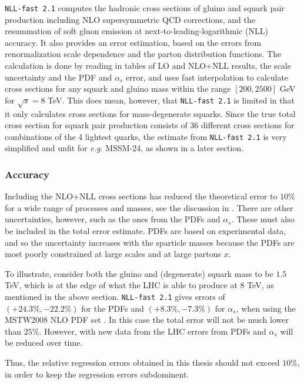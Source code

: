 \documentclass[twoside,english]{uiofysmaster}
\begin{document}
{\verb|NLL-fast 2.1| \cite{beenakker1997squark, kulesza2009threshold, kulesza2009soft, beenakker2009soft, beenakker2011squark} computes the hadronic cross sections of gluino and squark pair production including NLO supersymmetric QCD corrections, and the resummation of soft gluon emission at next-to-leading-logarithmic (NLL) accuracy. It also provides an error estimation, based on the errors from renormalization scale dependence and the parton distribution functions. The calculation is done by reading in tables of LO and NLO+NLL results, the scale uncertainty and the PDF and $\alpha_s$ error, and uses fast interpolation to calculate cross sections for any squark and gluino mass within the range $[200, 2500]$ GeV for $\sqrt{s}=8$ TeV. This does mean, however, that \verb|NLL-fast 2.1| is limited in that it only calculates cross sections for mass-degenerate squarks. Since the true total cross section for squark pair production consists of 36 different cross sections for combinations of the 4 lightest quarks, the estimate from \verb|NLL-fast 2.1| is very simplified and unfit for \textit{e.g.} MSSM-24, as shown in a later section.

\subsubsection{Accuracy}

Including the NLO+NLL cross sections has reduced the theoretical error to $10 \%$ for a wide range of processes and masses, see the discussion in \cite{balazs2017colliderbit}. There are other uncertainties, however, such as the ones from the PDFs and $\alpha_s$. These must also be included in the total error estimate. PDFs are based on experimental data, and so the uncertainty increases with the sparticle masses because the PDFs are most poorly constrained at large scales and at large partons $x$.

To illustrate, consider both the gluino and (degenerate) squark mass to be $1.5$ TeV, which is at the edge of what the LHC is able to produce at 8 TeV, as mentioned in the above section. \verb|NLL-fast 2.1| gives errors of $(+24.3 \%, -22.2\%)$ for the PDFs and $(+8.3 \%, -7.3 \%)$ for $\alpha_s$, when using the MSTW2008 NLO PDF
set \cite{Martin:2009iq}. In this case the total error will not be much lower than $25 \%$. However, with new data from the LHC errors from PDFs and $\alpha_s$ will be reduced over time.

Thus, the relative regression errors obtained in this thesis should not exceed $10 \%$, in order to keep the regression errors subdominent.







}
\end{document}
